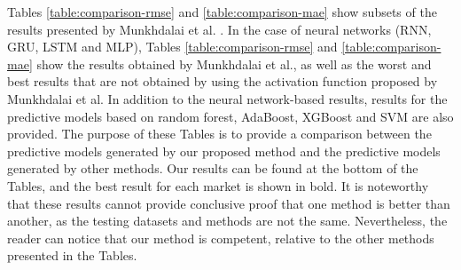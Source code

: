 \documentclass{ieeeaccess}
\begin{document}
Tables \ref{table:comparison-rmse} and \ref{table:comparison-mae} show
subsets of the results presented by Munkhdalai et
al. \cite{Munkhdalai2019}. In the case of neural networks (RNN, GRU,
LSTM and MLP), Tables \ref{table:comparison-rmse} and
\ref{table:comparison-mae} show the results obtained by Munkhdalai et
al., as well as the worst and best results that are not obtained by
using the activation function proposed by Munkhdalai et al. In
addition to the neural network-based results, results for the
predictive models based on random forest, AdaBoost, XGBoost and
SVM are also provided. The purpose of these Tables
is to provide a comparison between the predictive models generated by
our proposed method and the predictive models generated by other
methods. Our results can be found at the bottom of the Tables, and the
best result for each market is shown in bold. It is noteworthy that
these results cannot provide conclusive proof that one method is
better than another, as the testing datasets and methods are not the
same. Nevertheless, the reader can notice that our method is
competent, relative to the other methods presented in the Tables.

\end{document}
